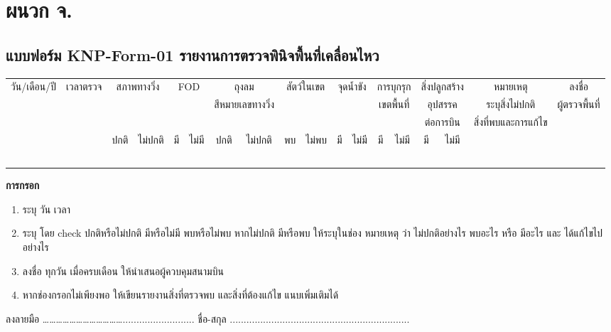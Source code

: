 
\chapter{ผนวก จ. }

\section{แบบฟอร์ม KNP-Form-01 รายงานการตรวจพินิจพื้นที่เคลื่อนไหว}

\begin{landscape}
\begin{table}[h!]
\begin{center}
\begin{tabular}{|c|c|c|c|c|c|c|c|c|c|c|c|c|c|c|c|c|c|}
\hline
\multirow{3}{*}{วัน/เดือน/ปี} & \multirow{3}{*}{เวลาตรวจ}  & \multicolumn{2}{c|}{\multirow{3}{*}{สภาพทางวิ่ง}} &  \multicolumn{2}{c|}{\multirow{3}{*}{FOD}} &  \multicolumn{2}{c|}{ถุงลม} &  \multicolumn{2}{c|}{\multirow{3}{*}{สัตว์ในเขต}} &  \multicolumn{2}{c|}{\multirow{3}{*}{จุดน้ำขัง}} &  \multicolumn{2}{c|}{การบุกรุก} &  \multicolumn{2}{c|}{สิ่งปลูกสร้าง} & หมายเหตุ  & ลงชื่อ \\ %
 & & \multicolumn{2}{c|}{} & \multicolumn{2}{c|}{} & \multicolumn{2}{c|}{สีหมายเลขทางวิ่ง} & \multicolumn{2}{c|}{} & \multicolumn{2}{c|}{} & \multicolumn{2}{c|}{เขตพื้นที่} & \multicolumn{2}{c|}{อุปสรรค} & ระบุสิ่งไม่ปกติ & ผู้ตรวจพื้นที่ \\
 & & \multicolumn{2}{c|}{} & \multicolumn{2}{c|}{} & \multicolumn{2}{c|}{} & \multicolumn{2}{c|}{} & \multicolumn{2}{c|}{} & \multicolumn{2}{c|}{} & \multicolumn{2}{c|}{ต่อการบิน} & สิ่งที่พบและการแก้ไข &  \\
\hline
 &  & ปกติ & ไม่ปกติ & มี & ไม่มี & ปกติ & ไม่ปกติ & พบ & ไม่พบ & มี & ไม่มี & มี & ไม่มี & มี & ไม่มี & & \\
 \hline
 & & & & & & & & & & & & & & & & &  \\
 \hline
&  & & & & & & & &  & &  & & & & & & \\
\hline
& &  & & & & & & & & & & & & & & & \\
\hline
 & & & & & & & & & & & & & & & & & \\
\hline
& & & & & & & & & & & & & & & & & \\
\hline
\end{tabular}
\end{center}
\end{table}%
\textbf{การกรอก}
\begin{enumerate}
\item ระบุ วัน เวลา
\item ระบุ โดย check ปกติหรือไม่ปกติ    มีหรือไม่มี  พบหรือไม่พบ  หากไม่ปกติ     มีหรือพบ ให้ระบุในช่อง หมายเหตุ ว่า ไม่ปกติอย่างไร พบอะไร หรือ มีอะไร และ ได้แก้ไขไปอย่างไร
\item ลงชื่อ ทุกวัน  เมื่อครบเดือน ให้นำเสนอผู้ควบคุมสนามบิน
\item หากช่องกรอกไม่เพียงพอ ให้เขียนรายงานสิ่งที่ตรวจพบ และสิ่งที่ต้องแก้ไข แนบเพิ่มเติมได้ 
\end{enumerate} %

\vskip 10pt
ลงลายมือ ………………………………..........................
\vskip 10pt
ชื่อ-สกุล ................................................................. %
\end{landscape}
